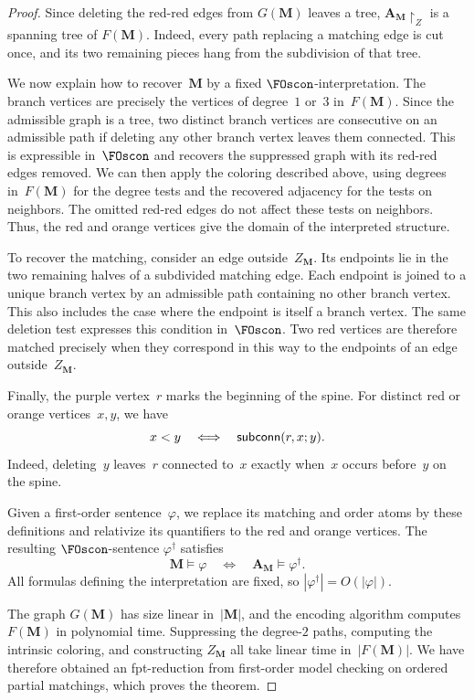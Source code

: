 \documentclass[1p,number,11pt]{elsarticle}
\newcommand{\scon}{\hbox{\sf subconn}}
\theoremstyle{plain}
\begin{document}
\begin{proof}
Since deleting the red-red edges from $G(\mathbf M)$ leaves a tree, $\mathbf A_{\mathbf M}\!\upharpoonright_Z$ is a spanning tree of
$F(\mathbf M)$. Indeed, every path replacing a matching edge is cut once,
and its two remaining pieces hang from the subdivision of that tree.

We now explain how to recover~$\mathbf M$ by a fixed
$\FOscon$-interpretation. The branch vertices are precisely the vertices
of degree~$1$ or~$3$ in~$F(\mathbf M)$. Since the admissible graph is a
tree, two distinct branch vertices are consecutive on an admissible path
if deleting any other branch vertex leaves them connected. This is
expressible in~$\FOscon$ and recovers the suppressed graph with its
red-red edges removed. We can then apply the coloring described above,
using degrees in~$F(\mathbf M)$ for the degree tests and the recovered
adjacency for the tests on neighbors. The omitted red-red edges do not
affect these tests on neighbors. Thus, the red and orange vertices give
the domain of the interpreted structure.

To recover the matching, consider an edge outside~$Z_{\mathbf M}$.
Its endpoints lie in the two remaining halves of a subdivided matching
edge. Each endpoint is joined to a unique branch vertex by an admissible
path containing no other branch vertex. This also includes the case
where the endpoint is itself a branch vertex. The same deletion test
expresses this condition in~$\FOscon$. Two red vertices are therefore
matched precisely when they correspond in this way to the endpoints
of an edge outside~$Z_{\mathbf M}$.

Finally, the purple vertex~$r$ marks the beginning of the spine.
For distinct red or orange vertices~$x,y$, we have
\[
    x<y \quad\Longleftrightarrow\quad \scon(r,x;y).
\]
Indeed, deleting~$y$ leaves~$r$ connected to~$x$ exactly when~$x$
occurs before~$y$ on the spine.

Given a first-order sentence~$\varphi$, we replace its matching and
order atoms by these definitions and relativize its quantifiers to
the red and orange vertices. The resulting $\FOscon$-sentence
$\varphi^\dagger$ satisfies
\[
    \mathbf M\models\varphi
    \quad\Longleftrightarrow\quad
    \mathbf A_{\mathbf M}\models\varphi^\dagger.
\]
All formulas defining the interpretation are fixed, so
$|\varphi^\dagger|=O(|\varphi|)$.

The graph $G(\mathbf M)$ has size linear in~$|\mathbf M|$, and the encoding
algorithm computes $F(\mathbf M)$ in polynomial time. Suppressing the
degree-$2$ paths, computing the intrinsic coloring, and constructing
$Z_{\mathbf M}$ all take linear time in~$|F(\mathbf M)|$. We have therefore
obtained an fpt-reduction from first-order model checking on ordered
partial matchings, which proves the theorem.
\end{proof}
\end{document}

